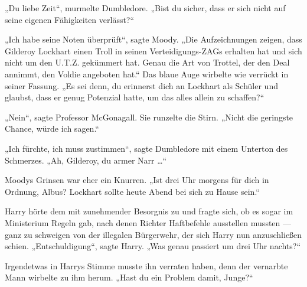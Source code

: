 „Du liebe Zeit“, murmelte Dumbledore.
„Bist du sicher, dass er sich nicht auf seine eigenen Fähigkeiten verlässt?“

„Ich habe seine Noten überprüft“, sagte Moody.
„Die Aufzeichnungen zeigen, dass Gilderoy Lockhart einen Troll in seinen Verteidigungs-ZAGs erhalten hat und sich nicht um den U.T.Z. gekümmert hat. Genau die Art von Trottel, der den Deal annimmt, den Voldie angeboten hat.“ Das blaue Auge wirbelte wie verrückt in seiner Fassung.
„Es sei denn, du erinnerst dich an Lockhart als Schüler und glaubst, dass er genug Potenzial hatte, um das alles allein zu schaffen?“

„Nein“, sagte Professor McGonagall. Sie runzelte die Stirn.
„Nicht die geringste Chance, würde ich sagen.“

„Ich fürchte, ich muss zustimmen“, sagte Dumbledore mit einem Unterton des Schmerzes.
„Ah, Gilderoy, du armer Narr …“

Moodys Grinsen war eher ein Knurren.
„Ist drei Uhr morgens für dich in Ordnung, Albus? Lockhart sollte heute Abend bei sich zu Hause sein.“

Harry hörte dem mit zunehmender Besorgnis zu und fragte sich, ob es sogar im Ministerium Regeln gab, nach denen Richter Haftbefehle ausstellen mussten — ganz zu schweigen von der illegalen Bürgerwehr, der sich Harry nun anzuschließen schien.
„Entschuldigung“, sagte Harry.
„Was genau passiert um drei Uhr nachts?“

Irgendetwas in Harrys Stimme musste ihn verraten haben, denn der vernarbte Mann wirbelte zu ihm herum.
„Hast du ein Problem damit, Junge?“


